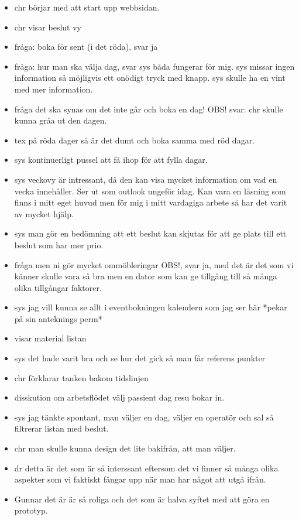 \documentclass[a4paper,10pt, twoside]{article}
\begin{document}
\begin{itemize}
    \item chr börjar med att start upp webbsidan.
    \item chr visar beslut vy
    \item fråga: boka för sent (i det röda), svar ja
    \item fråga: hur man ska välja dag, svar sys båda fungerar för mig. sys missar ingen information så möjligvis ett onödigt tryck med knapp. sys skulle ha en vint med mer information.
    \item fråga det ska synas om det inte går och boka en dag! OBS! svar: chr skulle kunna gråa ut den dagen.
    \item tex på röda dager så är det dumt och boka samma med röd dagar.
    \item sys kontinuerligt pussel att få ihop för att fylla dagar.
    \item sys veckovy är intressant, då den kan visa mycket information om vad en vecka innehåller. Ser ut som outlook ungeför idag. Kan vara en låsning som finns i mitt eget huvud men för mig i mitt vardagiga arbete så har det varit av mycket hjälp.
    \item sys man gör en bedömning att ett beslut kan skjutas för att ge plats till ett beslut som har mer prio.
    \item fråga men ni gör mycket ommöbleringar OBS!, svar ja, med det är det som vi känner skulle vara så bra men en dator som kan ge tillgång till så många olika tillgångar faktorer.
    \item sys jag vill kunna se allt i eventbokningen kalendern som jag ser här *pekar på sin anteknings perm*
    \item visar material listan
    \item sys det hade varit bra och se hur det gick så man får referens punkter
    \item chr förklarar tanken bakom tidslinjen
    \item disskution om arbetsflödet välj passient dag resu bokar in.
    \item sys jag tänkte spontant, man väljer en dag, väljer en operatör och sal så filtrerar listan med beslut.
    \item chr man skulle kunna design det lite bakifrån, att man väljer.
    \item dr detta är det som är så interssant eftersom det vi finner så många olika aspekter som vi faktiskt fångar upp när man har något att utgå ifrån.
    \item Gunnar det är är så roliga och det som är halva syftet med att göra en prototyp.

\end{itemize}
\end{document}
